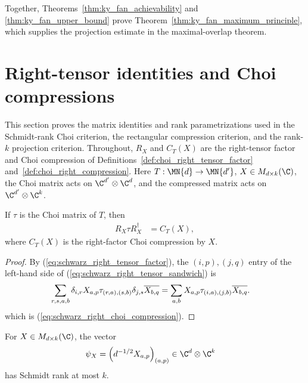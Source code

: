 Together, Theorems~\ref{thm:ky_fan_achievability} and
\ref{thm:ky_fan_upper_bound} prove Theorem~\ref{thm:ky_fan_maximum_principle},
which supplies the projection estimate in the maximal-overlap theorem.

\section{Right-tensor identities and Choi compressions}
\label{sec:app_positive_not_cp_choi_compression}

This section proves the matrix identities and rank parametrizations used in
the Schmidt-rank Choi criterion, the rectangular compression criterion, and
the rank-$k$ projection criterion. Throughout, $R_X$ and $C_T(X)$ are the
right-tensor factor and Choi compression of
Definitions~\ref{def:choi_right_tensor_factor}
and~\ref{def:choi_right_compression}. Here
$T:\MN{d}\to\MN{d'}$, $X\in M_{d\times k}(\C)$, the Choi matrix acts on
$\C^{d'}\otimes\C^d$, and the compressed matrix acts on
$\C^{d'}\otimes\C^k$.

\begin{theorem}
    \label{thm:choi_right_tensor_sandwich}
    \leanok
    If $\tau$ is the Choi matrix of $T$, then
    \begin{align}
        R_X\tau R_X^\dagger
         & =C_T(X),
        \label{eq:schwarz_right_tensor_sandwich}
    \end{align}
    where $C_T(X)$ is the right-factor Choi compression by $X$.
\end{theorem}

\begin{proof}
    \leanok
    By (\ref{eq:schwarz_right_tensor_factor}), the $(i,p),(j,q)$ entry of the
    left-hand side of (\ref{eq:schwarz_right_tensor_sandwich}) is
    \begin{align}
        \sum_{r,s,a,b}
        \delta_{i,r}X_{a,p}\tau_{(r,a),(s,b)}
        \delta_{j,s}\overline{X_{b,q}}
         & =\sum_{a,b}X_{a,p}\tau_{(i,a),(j,b)}
        \overline{X_{b,q}}.
        \notag
    \end{align}
    which is (\ref{eq:schwarz_right_choi_compression}).
\end{proof}

\begin{lemma}
    \label{lem:compressed_omega_schmidt_rank}
    \leanok
    For $X\in M_{d\times k}(\C)$, the vector
    \begin{align}
        \psi_X
         & =\left(d^{-1/2}X_{a,p}\right)_{(a,p)}
        \in\C^d\otimes\C^k
        \label{eq:schwarz_compressed_omega}
    \end{align}
    has Schmidt rank at most $k$.
\end{lemma}

